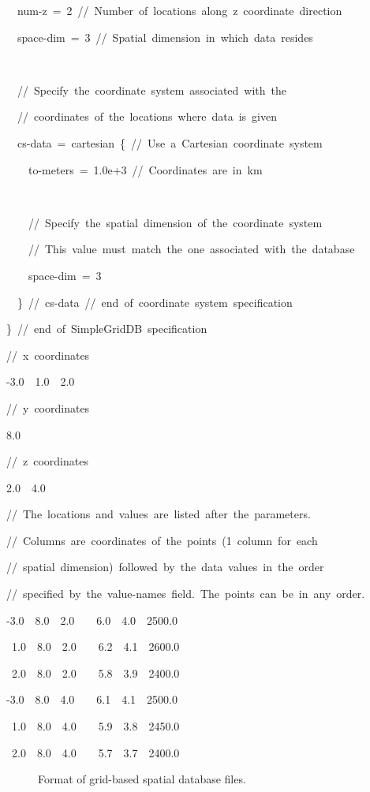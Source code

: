 \begin{lyxcode}
~~num-z~=~2~//~Number~of~locations~along~z~coordinate~direction

~~space-dim~=~3~//~Spatial~dimension~in~which~data~resides

~

~~//~Specify~the~coordinate~system~associated~with~the~

~~//~coordinates~of~the~locations~where~data~is~given

~~cs-data~=~cartesian~\{~//~Use~a~Cartesian~coordinate~system

~~~~to-meters~=~1.0e+3~//~Coordinates~are~in~km

~

~~~~//~Specify~the~spatial~dimension~of~the~coordinate~system

~~~~//~This~value~must~match~the~one~associated~with~the~database

~~~~space-dim~=~3

~~\}~//~cs-data~//~end~of~coordinate~system~specification

\}~//~end~of~SimpleGridDB~specification

//~x~coordinates

-3.0~~1.0~~2.0



//~y~coordinates

8.0



//~z~coordinates

2.0~~4.0



//~The~locations~and~values~are~listed~after~the~parameters.

//~Columns~are~coordinates~of~the~points~(1~column~for~each~

//~spatial~dimension)~followed~by~the~data~values~in~the~order~

//~specified~by~the~value-names~field.~The~points~can~be~in~any~order.

-3.0~~8.0~~2.0~~~~6.0~~4.0~~2500.0

~1.0~~8.0~~2.0~~~~6.2~~4.1~~2600.0

~2.0~~8.0~~2.0~~~~5.8~~3.9~~2400.0

-3.0~~8.0~~4.0~~~~6.1~~4.1~~2500.0

~1.0~~8.0~~4.0~~~~5.9~~3.8~~2450.0

~2.0~~8.0~~4.0~~~~5.7~~3.7~~2400.0
\end{lyxcode}
\begin{figure}[H]
\caption{Format of grid-based spatial database files.}
\end{figure}



